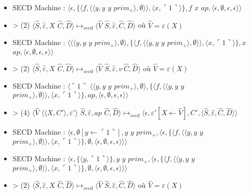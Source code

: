 \documentclass[10pt,a4paper]{report}
\begin{document}
\begin{itemize}
\item[] SECD Machine : $\langle\epsilon,\{\langle f,\langle\langle y,y$ $y$ $prim_{+}\rangle,\emptyset\rangle\rangle,\langle x,\ulcorner 1\urcorner\rangle\},f$ $x$ $ap,\langle\epsilon,\emptyset,\epsilon,\epsilon\rangle\rangle$
\item[] > (2) $\langle\widehat{S},\widehat{\varepsilon},X$ $\widehat{C},\widehat{D}\rangle \longmapsto_{secd} \langle \widehat{V}$ $\widehat{S},\widehat{\varepsilon},\widehat{C},\widehat{D}\rangle$ où $\widehat{V} = \varepsilon(X)$
\item[] SECD Machine : $\langle\langle\langle y,y$ $y$ $prim_{+}\rangle,\emptyset\rangle,\{\langle f,\langle\langle y,y$ $y$ $prim_{+}\rangle,\emptyset\rangle\rangle,\langle x,\ulcorner 1\urcorner\rangle\},x$ $ap,\langle\epsilon,\emptyset,\epsilon,\epsilon\rangle\rangle$
\item[] > (2) $\langle\widehat{S},\widehat{\varepsilon},X$ $\widehat{C},\widehat{D}\rangle \longmapsto_{secd} \langle \widehat{V}$ $\widehat{S},\widehat{\varepsilon},v~
  \widehat{C},\widehat{D}\rangle$ où $\widehat{V} = \varepsilon(X)$
\item[] SECD Machine : $\langle\ulcorner 1\urcorner$ $\langle\langle y,y$ $y$ $prim_{+}\rangle,\emptyset\rangle,\{\langle f,\langle\langle y,y$ $y$ $prim_{+}\rangle,\emptyset\rangle\rangle,\langle x,\ulcorner 1\urcorner\rangle\},ap,\langle\epsilon,\emptyset,\epsilon,\epsilon\rangle\rangle$
\item[] > (4) $\langle\widehat{V}$ $\langle\langle X,C'\rangle,\varepsilon'\rangle$ $\widehat{S},\widehat{\varepsilon},ap$ $\widehat{C},\widehat{D}\rangle \longmapsto_{secd} \langle\epsilon,\varepsilon'[X \leftarrow \widehat{V}],C',\langle\widehat{S},\widehat{\varepsilon},\widehat{C},\widehat{D}\rangle\rangle$
\item[] SECD Machine :	$\langle\epsilon,\emptyset[y \leftarrow \ulcorner 1\urcorner],y$ $y$ $prim_{+},\langle\epsilon,\{\langle f,\langle\langle y,y$ $y$ $prim_{+}\rangle,\emptyset\rangle\rangle,\langle x,\ulcorner 1\urcorner\rangle\} ,\emptyset,\langle\epsilon,\emptyset,\epsilon,\epsilon\rangle\rangle\rangle$
\item[] SECD Machine : $\langle\epsilon,\{\langle y,\ulcorner 1\urcorner\rangle\},y$ $y$ $prim_{+},\langle\epsilon,\{\langle f,\langle\langle y,y$ $y$ $prim_{+}\rangle,\emptyset\rangle\rangle,\langle x,\ulcorner 1\urcorner\rangle\} ,\emptyset,\langle\epsilon,\emptyset,\epsilon,\epsilon\rangle\rangle\rangle$
\item[] > (2) $\langle\widehat{S},\widehat{\varepsilon},X$ $\widehat{C},\widehat{D}\rangle \longmapsto_{secd} \langle \widehat{V}$ $\widehat{S},\widehat{\varepsilon},\widehat{C},\widehat{D}\rangle$ où $\widehat{V} = \varepsilon(X)$

\end{itemize}
\end{document}
